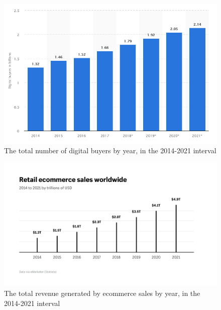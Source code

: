 \documentclass[12pt,a4paper,twoside]{report}
\begin{document}
\begin{figure}[ht]
  \centering
  \includegraphics[width=\linewidth]{img/global_buyers_2017.png}
  \caption[]{The total number of digital buyers by year, in the 2014-2021 interval \footnotemark[1] \footnotemark[2]}
  \label{fig:global_buyers_2017}
\end{figure}


\begin{figure}[ht]
  \centering
  \includegraphics[width=\linewidth]{img/Retail_ecommerce_sales_worldwide.png}
  \caption[]{The total revenue generated by ecommerce sales by year, in the 2014-2021 interval \footnotemark[3]}
  \label{fig:global_revenue_2017}
\end{figure}

\end{document}
